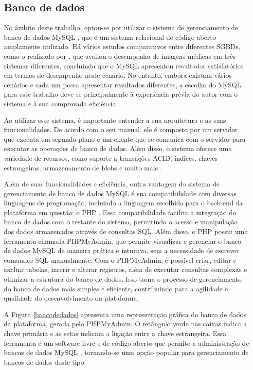 \documentclass[tcc,capa]{texufpel}
\begin{document}
\subsection{Banco de dados}
No âmbito deste trabalho, optou-se por utilizar o sistema de gerenciamento de banco de dados MySQL \cite{mysql:2022}, que é um sistema relacional de código aberto amplamente utilizado. Há vários estudos comparativos entre diferentes SGBDs, como o realizado por \citet{Delfino:2012}, que avaliou o desempenho de imagens médicas em três sistemas diferentes, concluindo que o MySQL apresentou resultados satisfatórios em termos de desempenho neste cenário. No entanto, embora existam vários cenários e cada um possa apresentar resultados diferentes, a escolha do MySQL para este trabalho deve-se principalmente à experiência prévia do autor com o sistema e à sua comprovada eficiência.

Ao utilizar esse sistema, é importante entender a sua arquitetura e as suas funcionalidades. De acordo com o seu manual, ele é composto por um servidor que executa em segundo plano e um cliente que se comunica com o servidor para executar as operações de banco de dados. Além disso, o sistema oferece uma variedade de recursos, como suporte a transações ACID, índices, chaves estrangeiras, armazenamento de blobs e muito mais \cite{mysql:2022}. 

Além de suas funcionalidades e eficiência, outra vantagem do sistema de gerenciamento de banco de dados MySQL \cite{mysql:2022} é sua compatibilidade com diversas linguagens de programação, incluindo a linguagem escolhida para o back-end da plataforma em questão: o PHP \cite{PHP:2022}. Essa compatibilidade facilita a integração do banco de dados com o restante do sistema, permitindo o acesso e manipulação dos dados armazenados através de consultas SQL. Além disso, o PHP possui uma ferramenta chamada PHPMyAdmin, que permite visualizar e gerenciar o banco de dados MySQL de maneira prática e intuitiva, sem a necessidade de escrever comandos SQL manualmente. Com o PHPMyAdmin, é possível criar, editar e excluir tabelas, inserir e alterar registros, além de executar consultas complexas e otimizar a estrutura do banco de dados. Isso torna o processo de gerenciamento do banco de dados mais simples e eficiente, contribuindo para a agilidade e qualidade do desenvolvimento da plataforma.


A Figura \ref{bancodedados} apresenta uma representação gráfica do banco de dados da plataforma, gerada pelo PHPMyAdmin. O retângulo verde nas caixas indica a chave primária e as setas indicam a ligação entre a chave estrangeira. Essa ferramenta é um software livre e de código aberto que permite a administração de bancos de dados MySQL \cite{mysql:2022}, tornando-se uma opção popular para gerenciamento de bancos de dados deste tipo. 
\end{document}
